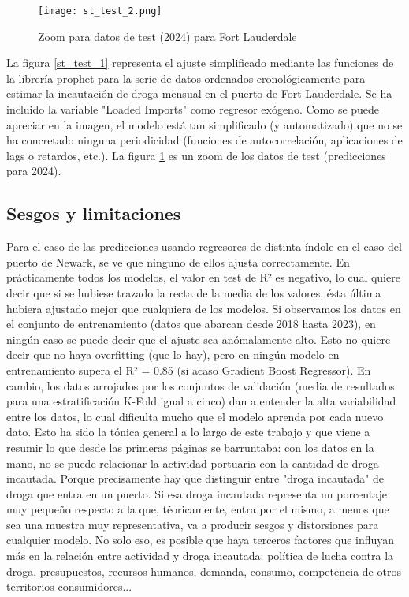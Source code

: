 \documentclass[12pt]{article}
\begin{document}
	\begin{figure}[H]
		\caption{\label{st_test_2} Zoom para datos de test (2024) para Fort Lauderdale}
		\centering
		\hspace*{1cm}
		\texttt{[image: st\_test\_2.png]}
	\end{figure}

	La figura \ref{st_test_1} representa el ajuste simplificado mediante las funciones de la librería prophet para la serie de datos ordenados cronológicamente para estimar la incautación de droga mensual en el puerto de Fort Lauderdale. Se ha incluido la variable "Loaded Imports" como regresor exógeno. Como se puede apreciar en la imagen, el modelo está tan simplificado (y automatizado) que no se ha concretado ninguna periodicidad (funciones de autocorrelación, aplicaciones de lags o retardos, etc.). La figura \ref{st_test_2} es un zoom de los datos de test (predicciones para 2024).
	
	
	\subsection{\label{sesgos}Sesgos y limitaciones}
	Para el caso de las predicciones usando regresores de distinta índole en el caso del puerto de Newark, se ve que ninguno de ellos ajusta correctamente. En prácticamente todos los modelos, el valor en test de R² es negativo, lo cual quiere decir que si se hubiese trazado la recta de la media de los valores, ésta última hubiera ajustado mejor que cualquiera de los modelos. Si observamos los datos en el conjunto de entrenamiento (datos que abarcan desde 2018 hasta 2023), en ningún caso se puede decir que el ajuste sea anómalamente alto. Esto no quiere decir que no haya overfitting (que lo hay), pero en ningún modelo en entrenamiento supera el R² = 0.85 (si acaso Gradient Boost Regressor). En cambio, los datos arrojados por los conjuntos de validación (media de resultados para una estratificación K-Fold igual a cinco) dan a entender la alta variabilidad entre los datos, lo cual dificulta mucho que el modelo aprenda por cada nuevo dato. Esto ha sido la tónica general a lo largo de este trabajo y que viene a resumir lo que desde las primeras páginas se barruntaba: con los datos en la mano, no se puede relacionar la actividad portuaria con la cantidad de droga incautada. Porque precisamente hay que distinguir entre "droga incautada" de droga que entra en un puerto. Si esa droga incautada representa un porcentaje muy pequeño respecto a la que, téoricamente, entra por el mismo, a menos que sea una muestra muy representativa, va a producir sesgos y distorsiones para cualquier modelo. No solo eso, es posible que haya terceros factores que influyan más en la relación entre actividad y droga incautada: política de lucha contra la droga, presupuestos, recursos humanos, demanda, consumo, competencia de otros territorios consumidores...
	
\end{document}
